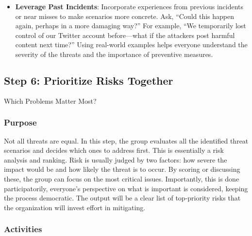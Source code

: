 \begin{itemize}
\item \textbf{Leverage Past Incidents}: Incorporate experiences from previous
incidents or near misses to make scenarios more concrete. Ask, “Could this
happen again, perhaps in a more damaging way?” For example, “We temporarily lost
control of our Twitter account before—what if the attackers post harmful content
next time?” Using real-world examples helps everyone understand the severity of
the threats and the importance of preventive measures.
\end{itemize}

\subsection{Step 6: Prioritize Risks Together}
\label{subsec:Step6}

Which Problems Matter Most?

\subsubsection{Purpose}

Not all threats are equal. In this step, the group evaluates all the
identified threat scenarios and decides which ones to address first. This is
essentially a risk analysis and ranking. Risk is usually judged by two factors:
how severe the impact would be and how likely the threat is to occur. By scoring
or discussing these, the group can focus on the most critical issues.
Importantly, this is done participatorily, everyone's perspective on what is
important is considered, keeping the process democratic. The output will be a
clear list of top-priority risks that the organization will invest effort in mitigating.

\subsubsection{Activities}

